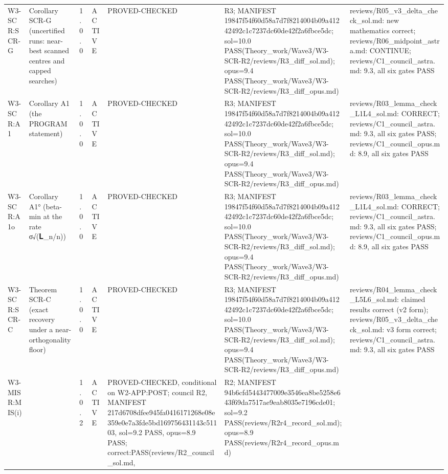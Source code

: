 \begin{longtable}{p{2.2cm}p{2.2cm}p{0.7cm}p{1.2cm}p{3.2cm}p{1.8cm}p{3cm}}
W3-SCR:SCR-G & Corollary SCR-G (uncertified runs: near-best scanned centres and capped searches) & 1.0.0 & ACTIVE & PROVED-CHECKED & R3; MANIFEST 19847f54f60d58a7d7f8214004b09a41242492c1c7237dc60de42f2a6fbce5dc; sol=10.0 PASS(Theory\_work/Wave3/W3-SCR-R2/reviews/R3\_diff\_sol.md); opus=9.4 PASS(Theory\_work/Wave3/W3-SCR-R2/reviews/R3\_diff\_opus.md) & reviews/R05\_v3\_delta\_check\_sol.md: new mathematics correct; reviews/R06\_midpoint\_astra.md: CONTINUE; reviews/C1\_council\_astra.md: 9.3, all six gates PASS \\
W3-SCR:A1 & Corollary A1 (the PROGRAM statement) & 1.0.0 & ACTIVE & PROVED-CHECKED & R3; MANIFEST 19847f54f60d58a7d7f8214004b09a41242492c1c7237dc60de42f2a6fbce5dc; sol=10.0 PASS(Theory\_work/Wave3/W3-SCR-R2/reviews/R3\_diff\_sol.md); opus=9.4 PASS(Theory\_work/Wave3/W3-SCR-R2/reviews/R3\_diff\_opus.md) & reviews/R03\_lemma\_check\_L1L4\_sol.md: CORRECT; reviews/C1\_council\_astra.md: 9.3, all six gates PASS; reviews/C1\_council\_opus.md: 8.9, all six gates PASS \\
W3-SCR:A1o & Corollary A1° (beta-min at the rate σ√(𝐋\_n/n)) & 1.0.0 & ACTIVE & PROVED-CHECKED & R3; MANIFEST 19847f54f60d58a7d7f8214004b09a41242492c1c7237dc60de42f2a6fbce5dc; sol=10.0 PASS(Theory\_work/Wave3/W3-SCR-R2/reviews/R3\_diff\_sol.md); opus=9.4 PASS(Theory\_work/Wave3/W3-SCR-R2/reviews/R3\_diff\_opus.md) & reviews/R03\_lemma\_check\_L1L4\_sol.md: CORRECT; reviews/C1\_council\_astra.md: 9.3, all six gates PASS; reviews/C1\_council\_opus.md: 8.9, all six gates PASS \\
W3-SCR:SCR-C & Theorem SCR-C (exact recovery under a near-orthogonality floor) & 1.0.0 & ACTIVE & PROVED-CHECKED & R3; MANIFEST 19847f54f60d58a7d7f8214004b09a41242492c1c7237dc60de42f2a6fbce5dc; sol=10.0 PASS(Theory\_work/Wave3/W3-SCR-R2/reviews/R3\_diff\_sol.md); opus=9.4 PASS(Theory\_work/Wave3/W3-SCR-R2/reviews/R3\_diff\_opus.md) & reviews/R04\_lemma\_check\_L5L6\_sol.md: claimed results correct (v2 form); reviews/R05\_v3\_delta\_check\_sol.md: v3 form correct; reviews/C1\_council\_astra.md: 9.3, all six gates PASS \\
W3-MISR:MIS(i) &  & 1.0.2 & ACTIVE & PROVED-CHECKED, conditional on W2-APP:POST; council R2, MANIFEST 217d6708dfee945fa0416171268e08e359e0e7a3fde5bd169756431143c51103, sol=9.2 PASS, opus=8.9 PASS; correct:PASS(reviews/R2\_council\_sol.md,  & R2; MANIFEST 94b6cfd5443477009e3546ea8be5258e643f69da7517ae9eab8035e7196cde01; sol=9.2 PASS(reviews/R2r4\_record\_sol.md); opus=8.9 PASS(reviews/R2r4\_record\_opus.md) &  \\

\end{longtable}
